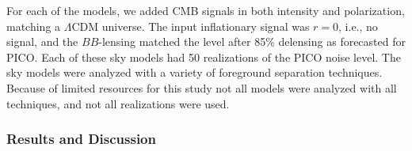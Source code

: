 \documentclass[PICOReport.tex]{subfiles}
\begin{document}
For each of the models, we added CMB signals in both intensity and polarization, matching a $\Lambda$CDM universe. The input inflationary signal was $r=0$, i.e., no signal, and the $BB$-lensing matched the level after 85\% delensing as forecasted for PICO. Each of these sky models had 50 realizations of the PICO noise level. 
The sky models were analyzed with a variety of foreground separation techniques.
Because of limited resources for this study not all models were analyzed with all techniques, and not all realizations were used. 

\subsubsection{Results and Discussion}
\label{sec:foregrounds_results}
\end{document}
